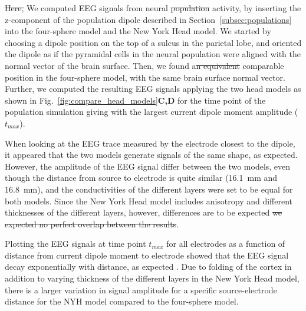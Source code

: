 \documentclass[preprint,10pt,authoryear]{elsarticle}
\newcommand{\sntxt}[1]{{\color{NavyBlue}#1}}
\newcommand{\tvntxt}[1]{{\color{Emerald}#1}}
\begin{document}
\sntxt{
\tvntxt{\sout{Here, }}We computed EEG signals from neural \tvntxt{\sout{population}} activity, by inserting the z-component of the population dipole described in Section~\ref{subsec:populations} into the four-sphere model and the New York Head model. We started by choosing a dipole position on the top of a sulcus in the parietal lobe, and oriented the dipole as if the pyramidal cells in the neural population were aligned with the normal vector of the brain surface. Then, we found a\tvntxt{\sout{n equivalent} comparable} position in the four-sphere model, with the same brain surface normal vector. Further, we computed the resulting EEG signals applying the two head models as shown in Fig.~\ref{fig:compare_head_models}\textbf{C,D} for the time point of the population simulation giving with the largest current dipole moment amplitude ($t_{max}$). 

When looking at the EEG trace measured by the electrode closest to the dipole, it appeared that the two models generate signals of the same shape, as expected. However, the amplitude of the EEG signal differ between the two models, even though the distance from source to electrode is quite similar (16.1~mm and 16.8~mm), and the conductivities of the different layers were set to be equal for both models. Since the New York Head model includes anisotropy and different thicknesses of the different layers, however, \tvntxt{differences are to be expected \sout{we expected no perfect overlap between the results}}.


Plotting the EEG signals at time point $t_{max}$ for all electrodes as a function of distance from current dipole moment to electrode showed that the EEG signal decay exponentially with distance, as expected \citep{NUNEZ2006}. Due to folding of the cortex in addition to varying thickness of the different layers in the New York Head model, there is a larger variation in signal amplitude for a specific source-electrode distance for the NYH model compared to the four-sphere model.

}
\end{document}
